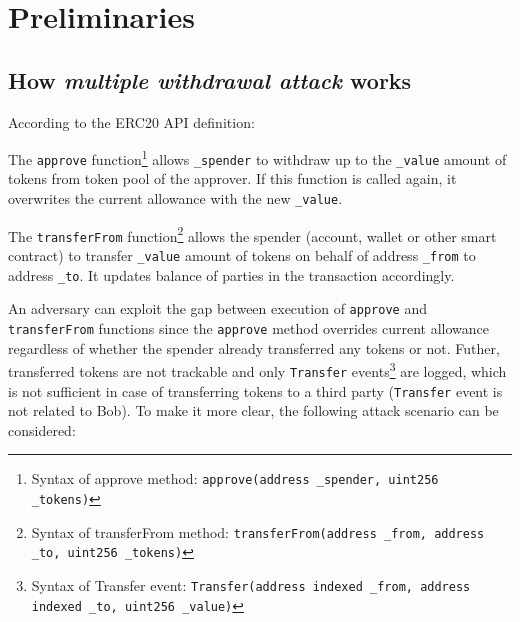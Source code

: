 
\section{Preliminaries}

\subsection{How \textit{multiple withdrawal attack} works}

According to the ERC20 API definition:

\begin{compactlist}
\item The \texttt{approve} function\footnote{Syntax of approve method: \texttt{approve(address \texttt{\_spender}, uint256 \texttt{\_tokens})}} allows \texttt{\_spender} to withdraw up to the \texttt{\_value} amount of tokens from token pool of the approver. If this function is called again, it overwrites the current allowance with the new \texttt{\_value}.
\item The \texttt{transferFrom} function\footnote{Syntax of transferFrom method: \texttt{transferFrom(address \texttt{\_from}, address \texttt{\_to}, uint256 \texttt{\_tokens})}} allows the spender (\eg account, wallet or other smart contract) to transfer \texttt{\_value} amount of tokens on behalf of address \texttt{\_from} to address \texttt{\_to}. It updates balance of parties in the transaction accordingly. 
\end{compactlist}

An adversary can exploit the gap between execution of \texttt{approve} and \texttt{transferFrom} functions since the \texttt{approve} method overrides current allowance regardless of whether the spender already transferred any tokens or not. Futher, transferred tokens are not trackable and only \texttt{Transfer} events\footnote{Syntax of Transfer event: \texttt{Transfer(address indexed \texttt{\_from}, address indexed \texttt{\_to}, uint256 \texttt{\_value})}} are logged, which is not sufficient in case of transferring tokens to a third party (\texttt{Transfer} event is not related to Bob). To make it more clear, the following attack scenario can be considered:


